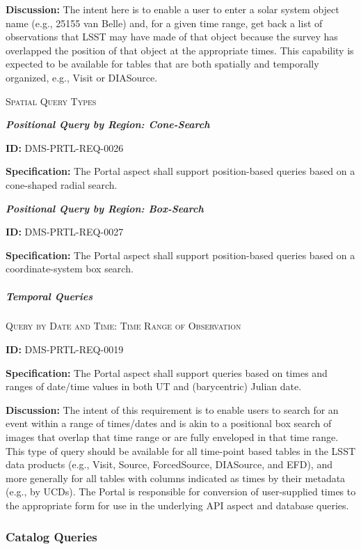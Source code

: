 \documentclass[SE,toc]{lsstdoc}
\begin{document}
\textbf{Discussion:}
The intent here is to enable a user to enter a solar system object name (e.g., 25155 van Belle) and, for a given time range, get back a list of observations that LSST may have made of that object because the survey has overlapped the position of that object at the appropriate times.
This capability is expected to be available for tables that are both spatially and temporally organized, e.g., Visit or DIASource.

\textsc{Spatial Query Types}

\textbf{\textit{Positional Query by Region: Cone-Search}}

\label{DMS-PRTL-REQ-0026}
\textbf{ID:} DMS-PRTL-REQ-0026

\textbf{Specification:}
The Portal aspect shall support position-based queries based on a cone-shaped radial search.

\textbf{\textit{Positional Query by Region: Box-Search}}

\label{DMS-PRTL-REQ-0027}
\textbf{ID:} DMS-PRTL-REQ-0027

\textbf{Specification:}
The Portal aspect shall support position-based queries based on a coordinate-system box search.

\subparagraph{Temporal Queries}\hfill  %

\textsc{Query by Date and Time: Time Range of Observation}

\label{DMS-PRTL-REQ-0019}
\textbf{ID:} DMS-PRTL-REQ-0019

\textbf{Specification:}
The Portal aspect shall support queries based on times and ranges of date/time values in both UT and (barycentric) Julian date.

\textbf{Discussion:}
The intent of this requirement is to enable users to search for an event within a range of times/dates and is akin to a positional box search of images that overlap that time range or are fully enveloped in that time range.
This type of query should be available for all time-point based tables in the LSST data products (e.g., Visit, Source, ForcedSource, DIASource, and EFD), and more generally for all tables with columns indicated as times by their metadata (e.g., by UCDs).
The Portal is responsible for conversion of user-supplied times to the appropriate form for use in the underlying API aspect and database queries.

\subsubsection{Catalog Queries}
\end{document}
